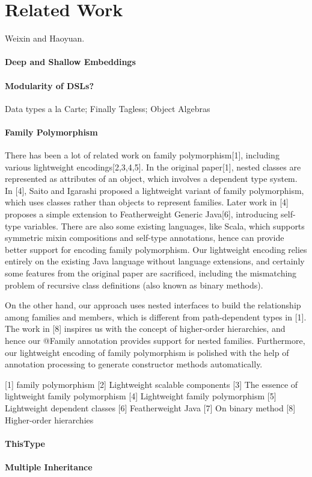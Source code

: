 \section{Related Work}

Weixin and Haoyuan.

\paragraph{Deep and Shallow Embeddings}

\paragraph{Modularity of DSLs?}
Data types a la Carte; Finally Tagless;
Object Algebras

\paragraph{Family Polymorphism}

There has been a lot of related work on family polymorphism[1], including various lightweight encodings[2,3,4,5]. In the original
paper[1], nested classes are represented as attributes of an object, which involves a dependent type system. In [4], Saito and Igarashi
proposed a lightweight variant of family polymorphism, which uses classes rather than objects to represent families. Later work in [4]
proposes a simple extension to Featherweight Generic Java[6], introducing self-type variables. There are also some existing languages,
like Scala, which supports symmetric mixin compositions and self-type annotations, hence can provide better support for encoding family
polymorphism. Our lightweight encoding relies entirely on the existing Java language without language extensions, and certainly some features from
the original paper are sacrificed, including the mismatching problem of recursive class definitions (also known as binary methods).

On the other hand, our approach uses nested interfaces to build the relationship among families and members, which is different from
path-dependent types in [1]. The work in [8] inspires us with the concept of higher-order hierarchies, and hence our \textsf{@Family} annotation
provides support for nested families. Furthermore, our lightweight encoding of family polymorphism is polished with the help of annotation processing
to generate constructor methods automatically.

[1] family polymorphism
[2] Lightweight scalable components
[3] The essence of lightweight family polymorphism
[4] Lightweight family polymorphism
[5] Lightweight dependent classes
[6] Featherweight Java
[7] On binary method
[8] Higher-order hierarchies

\paragraph{ThisType}

\paragraph{Multiple Inheritance}
